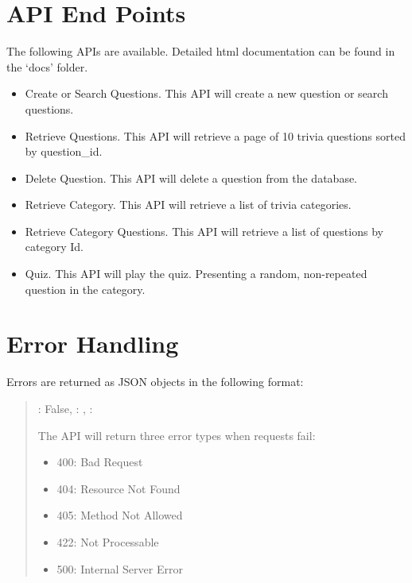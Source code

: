 \documentclass[letterpaper,10pt,english]{sphinxmanual}
\begin{document}
\section{API End Points}
\label{\detokenize{index:api-end-points}}
The following APIs are available. Detailed html documentation can be found in the ‘docs’ folder.
\begin{itemize}
\item {} 
Create or Search Questions. This API will create a new question or search questions.

\item {} 
Retrieve Questions. This API will retrieve a page of 10 trivia questions sorted by question\_id.

\item {} 
Delete Question. This API will delete a question from the database.

\item {} 
Retrieve Category. This API will retrieve a list of trivia categories.

\item {} 
Retrieve Category Questions. This API will retrieve a list of questions by category Id.

\item {} 
Quiz. This API will play the quiz. Presenting a random, non-repeated question in the category.

\end{itemize}


\section{Error Handling}
\label{\detokenize{index:error-handling}}
Errors are returned as JSON objects in the following format:
\begin{quote}

\begin{sphinxVerbatim}[commandchars=\\\{\}]
    : False,
    : ,
    : 
\end{sphinxVerbatim}

The API will return three error types when requests fail:
\begin{itemize}
\item {} 
400: Bad Request

\item {} 
404: Resource Not Found

\item {} 
405: Method Not Allowed

\item {} 
422: Not Processable

\item {} 
500: Internal Server Error

\end{itemize}
\end{quote}
\end{document}
